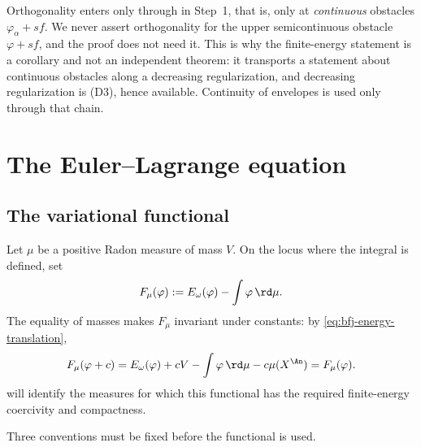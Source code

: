 \begin{remark}
\label{rem:ch27-e1-hypotheses}
Orthogonality enters  only through
 in Step~1, that is, only at
\emph{continuous} obstacles \(\varphi_\alpha+sf\).  We never assert
orthogonality for the upper semicontinuous obstacle \(\varphi+sf\), and the
proof does not need it.  This is why the finite-energy statement is a
corollary and not an independent theorem: it transports a statement about
continuous obstacles along a decreasing regularization, and decreasing
regularization is \textup{(D3)}, hence available.  Continuity of envelopes is
used only through that chain.
\end{remark}

\section{The Euler--Lagrange equation}
\label{sec:ch27-euler-lagrange}

\subsection{The variational functional}
\label{sec:ch27-variational-functional}

Let \(\mu\) be a positive Radon measure of mass \(V\). On the locus where the
integral is defined, set
\begin{equation}\label{eq:bfj-variational-functional}
                  F_\mu(\varphi)
                  :=E_\omega(\varphi)-\int\varphi\,\rd \mu.
\end{equation}
The equality of masses makes \(F_\mu\) invariant under constants: by
\eqref{eq:bfj-energy-translation},
\[
 F_\mu(\varphi+c)=E_\omega(\varphi)+cV-\int\varphi\,\rd\mu-c\mu(X^{\An})
 =F_\mu(\varphi).
\]
will identify the measures for which this functional has the required
finite-energy coercivity and compactness.

Three conventions must be fixed before the functional is used.

